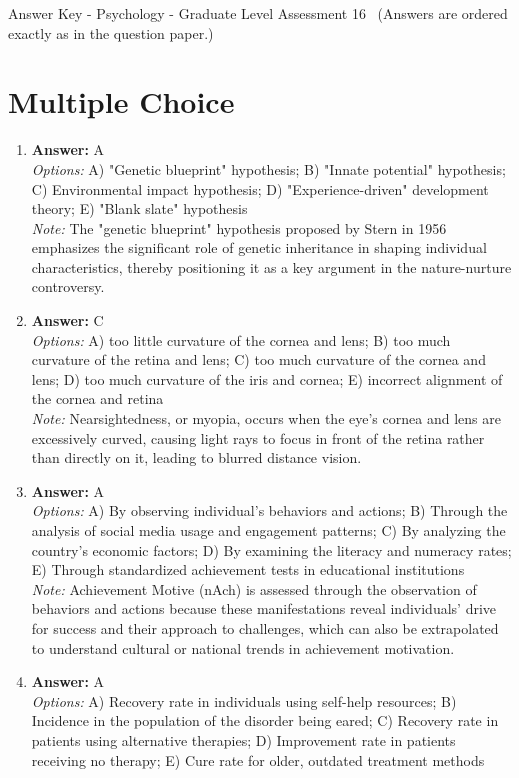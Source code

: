 \documentclass[12pt]{article}
\begin{document}
\begin{center}
Answer Key - Psychology - Graduate Level Assessment 16 \
\small (Answers are ordered exactly as in the question paper.)
\end{center}

\section*{Multiple Choice}
\begin{enumerate}[label=\arabic*.]
\item \textbf{Answer:} A
\\ \textit{Options:} A) "Genetic blueprint" hypothesis; B) "Innate potential" hypothesis; C) Environmental impact hypothesis; D) "Experience-driven" development theory; E) "Blank slate" hypothesis
\\ \textit{Note:} The "genetic blueprint" hypothesis proposed by Stern in 1956 emphasizes the significant role of genetic inheritance in shaping individual characteristics, thereby positioning it as a key argument in the nature-nurture controversy.
\item \textbf{Answer:} C
\\ \textit{Options:} A) too little curvature of the cornea and lens; B) too much curvature of the retina and lens; C) too much curvature of the cornea and lens; D) too much curvature of the iris and cornea; E) incorrect alignment of the cornea and retina
\\ \textit{Note:} Nearsightedness, or myopia, occurs when the eye's cornea and lens are excessively curved, causing light rays to focus in front of the retina rather than directly on it, leading to blurred distance vision.
\item \textbf{Answer:} A
\\ \textit{Options:} A) By observing individual's behaviors and actions; B) Through the analysis of social media usage and engagement patterns; C) By analyzing the country's economic factors; D) By examining the literacy and numeracy rates; E) Through standardized achievement tests in educational institutions
\\ \textit{Note:} Achievement Motive (nAch) is assessed through the observation of behaviors and actions because these manifestations reveal individuals' drive for success and their approach to challenges, which can also be extrapolated to understand cultural or national trends in achievement motivation.
\item \textbf{Answer:} A
\\ \textit{Options:} A) Recovery rate in individuals using self-help resources; B) Incidence in the population of the disorder being eared; C) Recovery rate in patients using alternative therapies; D) Improvement rate in patients receiving no therapy; E) Cure rate for older, outdated treatment methods

\end{enumerate}
\end{document}
